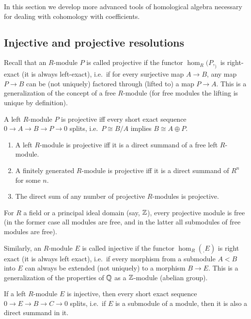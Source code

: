 In this section we develop more advanced tools of homological algebra necessary for dealing with cohomology with coefficients.

\subsection{Injective and projective resolutions}


Recall that an  $R$-module $P$ is called projective if the functor $\hom_R(P,_)$ is right-exact (it is always left-exact), i.e.\ if for every surjective map $A\to B$, any map $P\to B$ can be (not uniquely) factored through (lifted to) a map $P\to A$. This is a generalization of the concept of a free $R$-module (for free modules the lifting is unique by definition).

\begin{prop}
    A left $R$-module $P$ is projective iff every short exact sequence $0\to A\to B\to P\to 0$ splits, i.e.\ $P\cong B/A$ implies $B\cong A\oplus P$.
\end{prop}

\begin{thm}
    \begin{enumerate}
        \item A left $R$-module is projective iff it is a direct summand of a free left $R$-module.
        \item A finitely generated $R$-module  is projective iff it is a direct summand of $R^n$ for some $n$.
        \item The direct sum of any number of projective $R$-modules is projective.
    \end{enumerate}
\end{thm}

For $R$ a field or a principal ideal domain (say, $\mathbb{Z}$), every projective module is free (in the former case all modules are free, and in the latter all submodules of free modules are free).


Similarly, an $R$-module $E$ is called injective if the functor $\hom_R(_,E)$ is right exact (it is always left exact), i.e.\ if every morphism from a submodule $A<B$ into $E$ can always be extended (not uniquely) to a morphism $B\to E$. This is a generalization of the properties of $\mathbb{Q}$ as a $\mathbb{Z}$-module (abelian group).

\begin{prop}
    If a left $R$-module $E$ is injective, then every short exact sequence $0\to E\to B\to C\to 0$ splits, i.e.\ if $E$ is a submodule of a module, then it is also a direct summand in it.
\end{prop}

